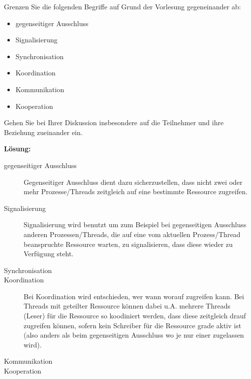 

\begin{description}

Grenzen Sie die folgenden Begriffe auf Grund der Vorlesung gegeneinander ab: 
    \begin{itemize}
      \item gegenseitiger Ausschluss 
      \item Signalisierung 
      \item Synchronisation 
      \item Koordination 
      \item Kommunikation 
      \item Kooperation 
    \end{itemize}
Gehen Sie bei Ihrer Diskussion insbesondere auf die Teilnehmer und ihre Beziehung 
zueinander ein. 

\textbf{Lösung:}\\

    \begin{description}
      \item[gegenseitiger Ausschluss]
        Gegenseitiger Ausschluss dient dazu sicherzustellen, dass nicht zwei oder mehr Prozesse/Threads zeitgleich auf eine bestimmte Ressource zugreifen.
      \item[Signalisierung ]
        Signalisierung wird benutzt um zum Beispiel bei gegenseitigen Ausschluss anderen Prozessen/Threads, die auf eine vom aktuellen Prozess/Thread beanspruchte Ressource warten, zu signalisieren, dass diese wieder zu Verfügung steht.
      \item[Synchronisation ]
      \item[Koordination ]
        Bei Koordination wird entschieden, wer wann worauf zugreifen kann. Bei Threads mit geteilter Ressource können dabei u.A. mehrere Threads (Leser) für die Ressource so koodiniert werden, dass diese zeitgleich drauf zugreifen können, sofern kein Schreiber für die Ressource grade aktiv ist (also anders als beim gegenseitigen Ausschluss wo je nur einer zugelassen wird).
      \item[Kommunikation ]
      \item[Kooperation ]
    \end{description}


\end{description}
